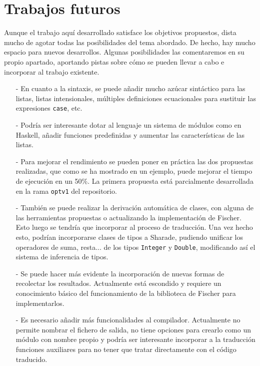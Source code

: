 \documentclass[class=article, crop=false]{standalone}
\begin{document}
\section{Trabajos futuros}
Aunque el trabajo aquí desarrollado satisface los objetivos propuestos, dista mucho de agotar
todas las posibilidades del tema abordado. De hecho, hay mucho espacio para nuevos
desarrollos. Algunas posibilidades las comentaremos en su propio apartado, aportando pistas
sobre cómo se pueden llevar a cabo e incorporar al trabajo existente. 

\begin{itemize}
  \item[-] En cuanto a la sintaxis, se puede añadir mucho azúcar sintáctico para las listas,
  listas intensionales, múltiples definiciones ecuacionales para sustituir las expresiones
  \verb`case`, etc.

  \item[-] Podría ser interesante dotar al lenguaje un sistema de módulos como en Haskell,
  añadir funciones predefinidas y aumentar las características de las listas.

  \item[-] Para mejorar el rendimiento se pueden poner en práctica las dos propuestas
  realizadas, que como se ha mostrado en un ejemplo, puede mejorar el tiempo de ejecución en
  un 50\%. La primera propuesta está parcialmente desarrollada en la rama \verb`optv1` del
  repositorio.

  \item[-] También se puede realizar la derivación automática de clases, con alguna de las
  herramientas propuestas o actualizando la implementación de Fischer. Esto luego se tendría
  que incorporar al proceso de traducción. Una vez hecho esto, podrían incorporarse clases de
  tipos a Sharade, pudiendo unificar los operadores de suma, resta... de los tipos
  \verb`Integer` y \verb`Double`, modificando así el sistema de inferencia de
  tipos\cite{smith1994principal}.

  \item[-] Se puede hacer más evidente la incorporación de nuevas formas de recolectar los
  resultados. Actualmente está escondido y requiere un conocimiento básico del funcionamiento
  de la biblioteca de Fischer para implementarlos.

  \item[-] Es necesario añadir más funcionalidades al compilador. Actualmente no permite
  nombrar el fichero de salida, no tiene opciones para crearlo como un módulo con nombre
  propio y podría ser interesante incorporar a la traducción funciones auxiliares para no
  tener que tratar directamente con el código traducido.
\end{itemize}
\end{document}
